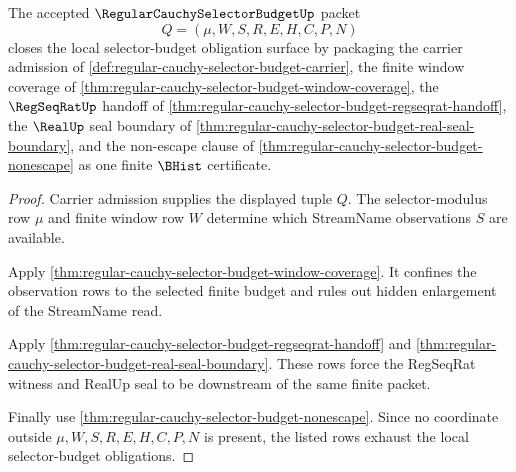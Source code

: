 \begin{theorem}
\label{thm:regular-cauchy-selector-budget-obligation-closure}
The accepted $\RegularCauchySelectorBudgetUp$ packet
$$
Q=(\mu,W,S,R,E,H,C,P,N)
$$
closes the local selector-budget obligation surface by packaging the carrier admission of \autoref{def:regular-cauchy-selector-budget-carrier}, the finite window coverage of \autoref{thm:regular-cauchy-selector-budget-window-coverage}, the $\RegSeqRatUp$ handoff of \autoref{thm:regular-cauchy-selector-budget-regseqrat-handoff}, the $\RealUp$ seal boundary of \autoref{thm:regular-cauchy-selector-budget-real-seal-boundary}, and the non-escape clause of \autoref{thm:regular-cauchy-selector-budget-nonescape} as one finite $\BHist$ certificate.
\end{theorem}
\begin{proof}
Carrier admission supplies the displayed tuple $Q$. The selector-modulus row $\mu$ and finite window row $W$ determine which StreamName observations $S$ are available.

Apply \autoref{thm:regular-cauchy-selector-budget-window-coverage}. It confines the observation rows to the selected finite budget and rules out hidden enlargement of the StreamName read.

Apply \autoref{thm:regular-cauchy-selector-budget-regseqrat-handoff} and \autoref{thm:regular-cauchy-selector-budget-real-seal-boundary}. These rows force the RegSeqRat witness and RealUp seal to be downstream of the same finite packet.

Finally use \autoref{thm:regular-cauchy-selector-budget-nonescape}. Since no coordinate outside $\mu,W,S,R,E,H,C,P,N$ is present, the listed rows exhaust the local selector-budget obligations.
\end{proof}

